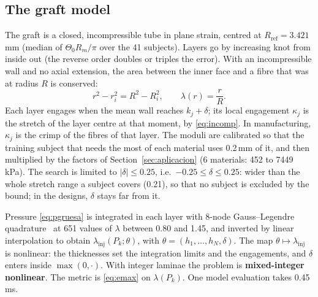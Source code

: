 \subsection{The graft model}
The graft is a closed, incompressible tube in plane strain, centred at $R_{\mathrm{ref}}=3.421$\,mm (median of $\Theta_0R_m/\pi$ over the 41 subjects). Layers go by increasing knot from inside out (the reverse order doubles or triples the error). With an incompressible wall and no axial extension, the area between the inner face and a fibre that was at radius $R$ is conserved:
\begin{equation}\label{eq:incomp}
r^2-r_i^2=R^2-R_i^2,\qquad\lambda(r)=\frac{r}{R}.
\end{equation}
Each layer engages when the mean wall reaches $k_j+\delta$; its local engagement $\kappa_j$ is the stretch of the layer centre at that moment, by \eqref{eq:incomp}. In manufacturing, $\kappa_j$ is the crimp of the fibres of that layer. The moduli are calibrated so that the training subject that needs the most of each material uses 0.2\,mm of it, and then multiplied by the factors of Section~\ref{sec:aplicacion} (6 materials: 452 to 7449\,kPa). The search is limited to $|\delta|\le0.25$, i.e.\ $-0.25\le\delta\le0.25$: wider than the whole stretch range a subject covers (0.21), so that no subject is excluded by the bound; in the designs, $\delta$ stays far from it.

Pressure \eqref{eq:pgruesa} is integrated in each layer with 8-node Gauss--Legendre quadrature~\cite{davis} at 651 values of $\lambda$ between 0.80 and 1.45, and inverted by linear interpolation to obtain $\lambda_{\mathrm{inj}}(P_k;\theta)$, with $\theta=(h_1,\dots,h_N,\delta)$. The map $\theta\mapsto\lambda_{\mathrm{inj}}$ is nonlinear: the thicknesses set the integration limits and the engagements, and $\delta$ enters inside $\max(0,\cdot)$. With integer laminae the problem is \textbf{mixed-integer nonlinear}. The metric is \eqref{eq:emax} on $\lambda(P_k)$. One model evaluation takes 0.45\,ms.

